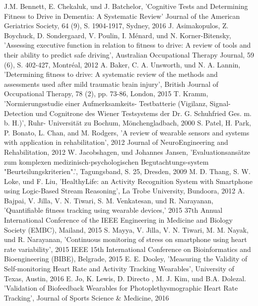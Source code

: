 \documentclass[conference]{IEEEtran}
\begin{document}
\begin{thebibliography}{00}
J.M. Bennett, E. Chekaluk, und J. Batchelor,
'Cognitive Tests and Determining Fitness to Drive in Dementia: A Systematic Review'
Journal of the American Geriatrics Society, 64 (9), S. 1904-1917, Sydney, 2016
J. Asimakopulos, Z. Boychuck, D. Sondergaard, V. Poulin, I. Ménard, und N. Korner-Bitensky, 'Assessing executive function in relation to fitness to drive: A review of tools and their ability to predict safe driving', Australian Occupational Therapy Journal, 59 (6), S. 402-427, Montréal, 2012
A. Baker, C. A. Unsworth, und N. A. Lannin,
'Determining fitness to drive: A systematic review of the methods and assessments used after mild traumatic brain injury', British Journal of Occupational Therapy, 78 (2), pp. 73-86, London, 2015
 T. Kramm, 'Normierungsstudie einer Aufmerksamkeits- Testbatterie (Vigilanz, Signal- Detection und Cognitrone des Wiener Testsystems der Dr. G. Schuhfried Ges. m. b. H.)', Ruhr- Universität zu Bochum, Mönchengladbach, 2000
 S. Patel, H. Park, P. Bonato, L. Chan, and M. Rodgers, 'A review of wearable sensors and systems with application in rehabilitation', 2012 Journal of NeuroEngineering and Rehabilitation, 2012
 W. Jacobshagen, und Johannes Jansen, 'Evaluationsansätze zum komplexen medizinisch-psychologischen Begutachtungs-system "Beurteilungskriterien".', Tagungsband, S. 25, Dresden, 2009
 M. D. Thang, S. W. Loke, und F. Liu, 'HealthyLife: an Activity Recognition System with Smartphone using Logic-Based Stream Reasoning',  La Trobe University, Bundoora, 2012
  A. Bajpai, V. Jilla, V. N. Tiwari, S. M. Venkatesan, und R. Narayanan, 'Quantifiable fitness tracking using wearable devices,' 2015 37th Annual International Conference of the IEEE Engineering in Medicine and Biology Society (EMBC), Mailand, 2015
 S. Mayya, V. Jilla, V. N. Tiwari, M. M. Nayak, und R. Narayanan, 'Continuous monitoring of stress on smartphone using heart rate variability', 2015 IEEE 15th International Conference on Bioinformatics and Bioengineering (BIBE), Belgrade, 2015
 E. E. Dooley, 'Measuring the Validity of Self-monitoring Heart Rate and Activity Tracking Wearables', University of Texas, Austin, 2016
 E. Jo, K. Lewis, D. Directo , M. J.  Kim, und B.A. Dolezal. 'Validation of Biofeedback Wearables for Photoplethysmographic Heart Rate Tracking', Journal of Sports Science \& Medicine, 2016

\end{thebibliography}
\end{document}
